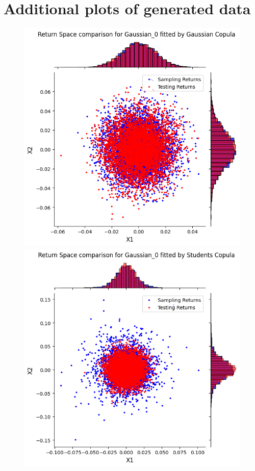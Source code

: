 \documentclass[%
a4paper,							
11pt,								
bibliography=totoc,						
abstracton=true					
]
{scrartcl}
\theoremstyle{plain}
\theoremstyle{definition}
\theoremstyle{remark}
\newcommand{\1}{\mathbbm{1}}
\begin{document}
\section{Additional plots of generated data}\label{sec:CopulaResultsData}
\begin{figure}[H]
    \centering
    \begin{minipage}{0.49\textwidth}
        \centering
        \includegraphics[width=\textwidth]{5ResultsDiscussion/pictures/PortfolioTest/Port1Gauss.png}
    \end{minipage}
    \hfill
    \begin{minipage}{0.49\textwidth}
        \centering
        \includegraphics[width=\textwidth]{5ResultsDiscussion/pictures/PortfolioTest/Port1Student.png}

\end{minipage}
\end{figure}
\end{document}
